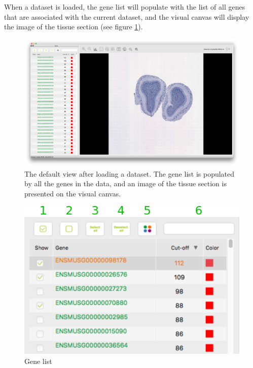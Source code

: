 \documentclass[10pt,a4paper,titlepage]{book}
\begin{document}
When a dataset is loaded, the gene list will populate with the list of all genes that are associated with the current dataset, and the visual canvas will display the image of the tissue section (see figure \ref{fig:default_loaded_data}). 
\begin{figure}
	\centering
	\includegraphics[width=0.9\linewidth]{./Pictures/default_dataset_loaded}
	\caption[Default view after loading a dataset]{The default view after loading a dataset. The gene list is populated by all the genes in the data, and an image of the tissue section is presented on the visual canvas.}
	\label{fig:default_loaded_data}
\end{figure}

\begin{figure}
	\centering
	\includegraphics[scale=0.7]{./Pictures/gene_list}
	\caption[Gene List]{Gene list}
	\label{fig:gene_list}
\end{figure}
\end{document}
